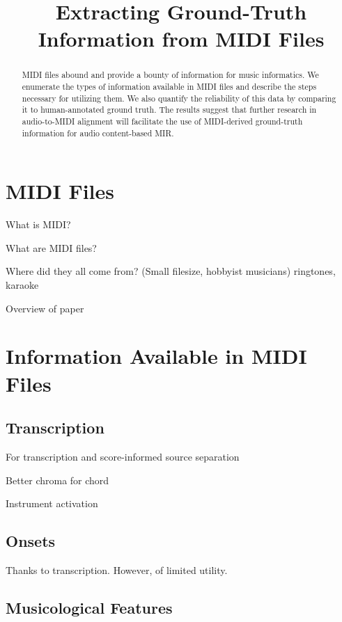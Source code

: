 \documentclass{article}
\title{Extracting Ground-Truth Information from MIDI Files}
\begin{document}
\maketitle

\begin{abstract}
MIDI files abound and provide a bounty of information for music informatics.
We enumerate the types of information available in MIDI files and describe the steps necessary for utilizing them.
We also quantify the reliability of this data by comparing it to human-annotated ground truth.
The results suggest that further research in audio-to-MIDI alignment will facilitate the use of MIDI-derived ground-truth information for audio content-based MIR.
\end{abstract}

\section{MIDI Files}\label{sec:introduction}

What is MIDI?

What are MIDI files?

Where did they all come from? (Small filesize, hobbyist musicians) ringtones, karaoke

Overview of paper

\section{Information Available in MIDI Files}

\subsection{Transcription}

For transcription and score-informed source separation

Better chroma for chord

Instrument activation

\subsection{Onsets}

Thanks to transcription.  However, of limited utility.

\subsection{Musicological Features}
\end{document}

